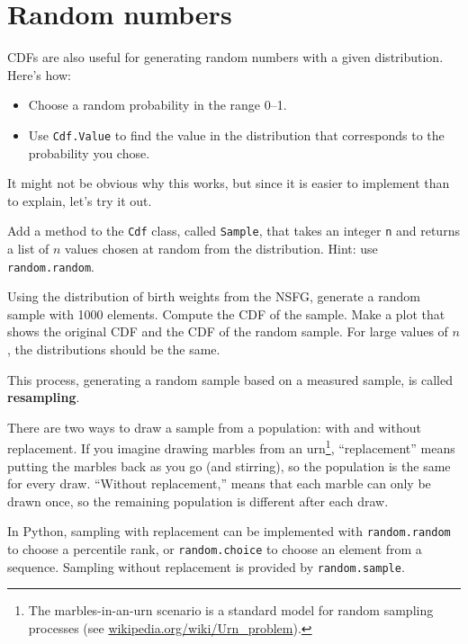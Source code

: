 \documentclass[12pt]{book}
\begin{document}
\section{Random numbers}
\label{random}

CDFs are also useful for generating random numbers
with a given distribution.  Here's how:

\begin{itemize}

\item Choose a random probability in the range 0--1.

\item Use {\tt Cdf.Value} to find the value in the distribution
that corresponds to the probability you chose.

\end{itemize}

It might not be obvious why this works, but since it is easier
to implement than to explain, let's try it out.

\begin{ex}

Add a method to the {\tt Cdf} class, called {\tt Sample}, that takes
an integer {\tt n} and returns a list of $n$ values chosen at
random from the distribution.  Hint: use {\tt random.random}.

Using the distribution of birth weights from the NSFG, generate a
random sample with 1000 elements.  Compute the CDF of the sample.
Make a plot that shows the original CDF and the CDF of the random
sample.  For large values of $n$, the distributions should be
the same.

\end{ex}

This process, generating a random sample based on a measured sample,
is called {\bf resampling}.

There are two ways to draw a sample from a population: with and
without replacement.  If you imagine drawing marbles from an
urn\footnote{The marbles-in-an-urn scenario is a standard model for
  random sampling processes (see
  \url{wikipedia.org/wiki/Urn_problem}).}, ``replacement'' means
putting the marbles back as you go (and stirring), so the population
is the same for every draw.  ``Without replacement,'' means that each
marble can only be drawn once, so the remaining population is
different after each draw.

In Python, sampling with replacement can be implemented with
{\tt random.random} to choose a percentile rank, or {\tt random.choice}
to choose an element from a sequence.  Sampling without replacement
is provided by {\tt random.sample}.
\end{document}
